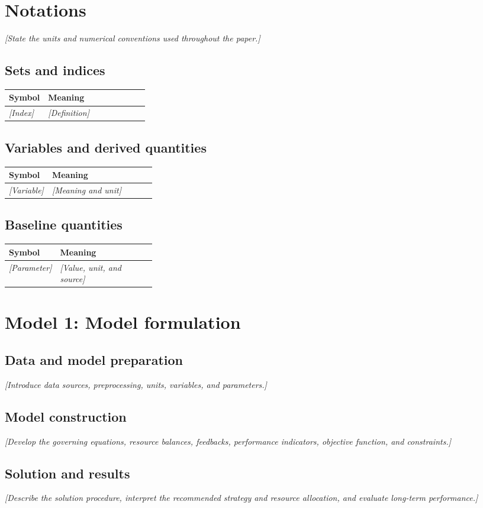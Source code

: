 \documentclass{mcmthesis}
\makeatletter
\newcommand{\modelvars}[1]{%
  \par\begingroup\small
  \setlength{\tabcolsep}{4pt}\renewcommand{\arraystretch}{1.10}
  \noindent\begin{tabularx}{\linewidth}{@{}>{\raggedright\arraybackslash}p{0.29\linewidth} >{\raggedright\arraybackslash}X@{}}
  \toprule\textbf{Symbol} & \textbf{Meaning} \\\midrule
  #1
  \bottomrule\end{tabularx}\par\endgroup
}
\newcommand{\placeholder}[1]{\par\noindent\textit{[#1]}\par}
\makeatother
\begin{document}
\clearpage
\section{Notations}
\placeholder{State the units and numerical conventions used throughout the paper.}
\subsection*{Sets and indices}
\modelvars{\textit{[Index]} & \textit{[Definition]} \\}
\subsection*{Variables and derived quantities}
\modelvars{\textit{[Variable]} & \textit{[Meaning and unit]} \\}
\subsection*{Baseline quantities}
\modelvars{\textit{[Parameter]} & \textit{[Value, unit, and source]} \\}

\clearpage
\section{Model 1: Model formulation}\label{sec:model1}
\subsection{Data and model preparation}
\placeholder{Introduce data sources, preprocessing, units, variables, and parameters.}
\subsection{Model construction}
\placeholder{Develop the governing equations, resource balances, feedbacks,
performance indicators, objective function, and constraints.}
\subsection{Solution and results}
\placeholder{Describe the solution procedure, interpret the recommended strategy
and resource allocation, and evaluate long-term performance.}




\end{document}
